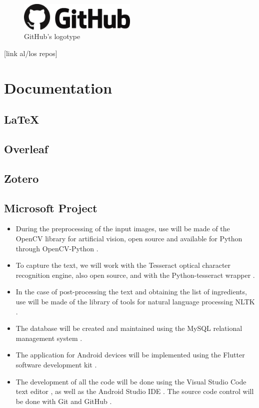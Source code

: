 \begin{figure}[h]
  \centering
  \includegraphics[width=0.5\textwidth]{Figures/github-logo.png}
  \caption{%
    GitHub's logotype
  }
  \label{fig:github-logo}
\end{figure}

[link al/los repos]

\section{Documentation}

\subsection{\LaTeX}

\subsection{Overleaf}

\subsection{Zotero}

\subsection{Microsoft Project}

\begin{itemize}
\item During the preprocessing of the input images, use will be made of the OpenCV \cite{noauthor_opencv_2021} library for artificial vision, open source and available for Python \cite{noauthor_python_2021} through OpenCV-Python \cite{noauthor_opencv-python_2021}.
\item To capture the text, we will work with the Tesseract \cite{noauthor_tesseract_2021} optical character recognition engine, also open source, and with the Python-tesseract wrapper \cite{lee_pytesseract_2021}.
\item In the case of post-processing the text and obtaining the list of ingredients, use will be made of the library of tools for natural language processing NLTK \cite{noauthor_natural_2021}.
\item The database will be created and maintained using the MySQL relational management system \cite{noauthor_mysql_2021}.
\item The application for Android devices will be implemented using the Flutter software development kit \cite{noauthor_flutter_2021}.
\item The development of all the code will be done using the Visual Studio Code text editor \cite{noauthor_documentation_2021}, as well as the Android Studio IDE \cite{noauthor_introduccion_2021}. The source code control will be done with Git \cite{noauthor_git_2021} and GitHub \cite{noauthor_githubcom_2021}.
\end{itemize}